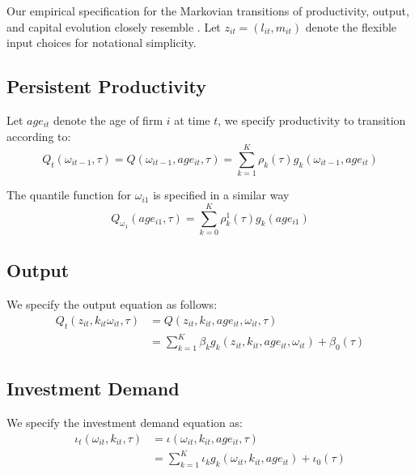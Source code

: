 \documentclass{article}
\begin{document}
Our empirical specification for the Markovian transitions of productivity, output, and capital evolution closely resemble \cite{Arellano2017}. Let $z_{it}=(l_{it}, m_{it})$ denote the flexible input choices for notational simplicity.

\subsection{Persistent Productivity}
Let $age_{it}$ denote the age of firm $i$ at time $t$, we specify productivity to transition according to:
\begin{equation}\label{omegamodel}
Q_{t}(\omega_{it-1}, \tau)=Q(\omega_{it-1}, age_{it}, \tau)=\sum_{k=1}^{K}\rho_{k}(\tau)g_{k}(\omega_{it-1}, age_{it})
\end{equation}

\noindent The quantile function for $\omega_{i1}$ is specified in a similar way
\begin{equation}
\label{omega1model}
Q_{\omega_{1}}(age_{i1}, \tau)=\sum_{k=0}^{K}\rho_{k}^{1}(\tau)g_{k}(age_{i1})
\end{equation}

\subsection{Output}
We specify the output equation as follows:
\begin{equation}\label{ymodel}
\begin{split}
Q_{t}(z_{it}, k_{it} \omega_{it}, \tau)&=Q(z_{it}, k_{it}, age_{it}, \omega_{it}, \tau)\\
&=\sum_{k=1}^{K}\beta_{k}g_{k}(z_{it}, k_{it}, age_{it}, \omega_{it})+\beta_{0}(\tau)
\end{split}
\end{equation}

\subsection{Investment Demand}
We specify the investment demand equation as:
\begin{equation}\label{imodel}
\begin{split}
\iota_{t}(\omega_{it}, k_{it}, \tau)&=\iota(\omega_{it}, k_{it}, age_{it}, \tau)\\
&=\sum_{k=1}^{K}\iota_{k}g_{k}(\omega_{it}, k_{it}, age_{it})+\iota_{0}(\tau)
\end{split}
\end{equation}
\end{document}
